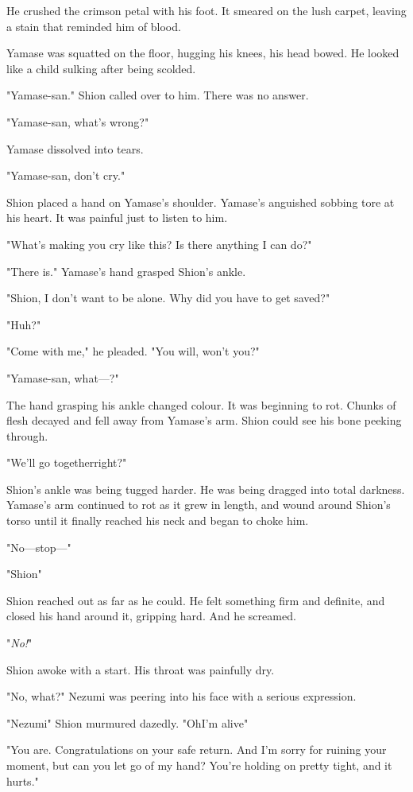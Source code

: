 He crushed the crimson petal with his foot. It smeared on the lush
carpet, leaving a stain that reminded him of blood.

\mybreak

Yamase was squatted on the floor, hugging his knees, his head bowed. He
looked like a child sulking after being scolded.

"Yamase-san." Shion called over to him. There was no answer.

"Yamase-san, what's wrong?"

Yamase dissolved into tears.

"Yamase-san, don't cry."

Shion placed a hand on Yamase's shoulder. Yamase's anguished sobbing
tore at his heart. It was painful just to listen to him.

"What's making you cry like this? Is there anything I can do?"

"There is." Yamase's hand grasped Shion's ankle.

"Shion, I don't want to be alone. Why did you have to get saved?"

"Huh?"

"Come with me," he pleaded. "You will, won't you?"

"Yamase-san, what---?"

The hand grasping his ankle changed colour. It was beginning to rot.
Chunks of flesh decayed and fell away from Yamase's arm. Shion could see
his bone peeking through.

"We'll go together\el right?"

Shion's ankle was being tugged harder. He was being dragged into total
darkness. Yamase's arm continued to rot as it grew in length, and wound
around Shion's torso until it finally reached his neck and began to
choke him.

"No---stop---"

"Shion\el "

Shion reached out as far as he could. He felt something firm and
definite, and closed his hand around it, gripping hard. And he screamed.

"\emph{No!}"

Shion awoke with a start. His throat was painfully dry.

"No, what?" Nezumi was peering into his face with a serious expression.

"Nezumi\el " Shion murmured dazedly. "Oh\el I'm alive\el "

"You are. Congratulations on your safe return. And I'm sorry for ruining
your moment, but can you let go of my hand? You're holding on pretty
tight, and it hurts."

